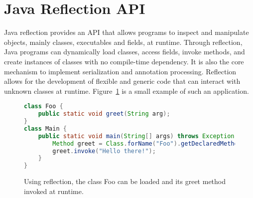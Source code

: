 



\section{Java Reflection API}
Java reflection provides an API that allows programs to inspect and manipulate objects, mainly classes, executables and fields, at runtime.
Through reflection, Java programs can dynamically load classes, access fields, invoke methods, and create instances of classes with no compile-time dependency. It is also the core mechanism to implement serialization and annotation processing.
Reflection allows for the development of flexible and generic code that can interact with unknown classes at runtime. Figure~\ref{fig:reflective_calls} is a small example of such an application.

\begin{figure}[ht]
    \centering
\begin{lstlisting}[language=Java]
class Foo {
    public static void greet(String arg);
}
class Main {
    public static void main(String[] args) throws Exception {
        Method greet = Class.forName("Foo").getDeclaredMethod("greet");
        greet.invoke("Hello there!");
    }  
}
\end{lstlisting}
    \caption{Using reflection, the class Foo can be loaded and its greet method invoked at runtime.}
    \label{fig:reflective_calls}
\end{figure}

